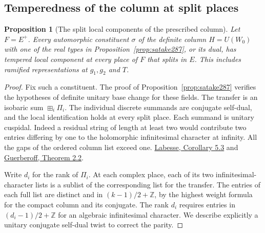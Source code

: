 \documentclass[a4paper,11pt]{article}
\newtheorem{proposition}{Proposition}[section]
\theoremstyle{definition}
\theoremstyle{remark}
\numberwithin{equation}{section}
\begin{document}
\subsection{Temperedness of the column at split places}\label{nav:VIII-54}
\begin{proposition}[The split local components of the prescribed column]\leavevmode
\label{prop:tempered292}
Let \(F=E^+\). Every automorphic constituent \(\sigma\)
of the definite column \(H=U(W_0)\) with one of the real
types in Proposition~\ref{prop:satake287}, or its dual,
has tempered local component at every place of \(F\) that
splits in \(E\). This includes ramified representations
at \(g_1,g_2\) and \(T\).
\end{proposition}
\begin{proof}
Fix such a constituent. The proof of
Proposition~\ref{prop:satake287} verifies the hypotheses
of definite unitary base change for these fields. The
transfer is an isobaric sum \(\boxplus_i\Pi_i\).
The individual discrete summands are conjugate self-dual,
and the local identification holds at every split place.
Each summand is unitary cuspidal. Indeed a residual
string of length at least two would contribute
two entries differing by one to the holomorphic
infinitesimal character at infinity. All the gaps of the
ordered column list exceed one.
\href{https://webusers.imj-prg.fr/~michael.harris/CBCM.pdf}
{Labesse, Corollary 5.3} and
\href{https://doi.org/10.1112/S0010437X10005154}
{Guerberoff, Theorem 2.2}.

Write \(d_i\) for the rank of \(\Pi_i\). At each complex
place, each of its two infinitesimal-character lists is a
sublist of the corresponding list for the transfer. The
entries of each full list are distinct and in
\((k-1)/2+\mathbb Z\), by the highest weight formula for
the compact column and its conjugate. The rank \(d_i\)
requires entries in \((d_i-1)/2+\mathbb Z\) for an
algebraic infinitesimal character. We describe explicitly
a unitary conjugate self-dual twist to correct the parity.


\end{proof}
\end{document}
